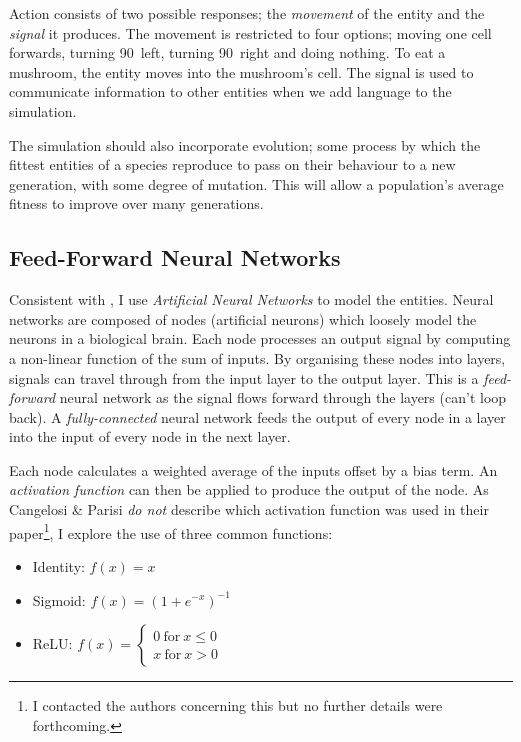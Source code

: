 \documentclass[12pt,a4paper]{report}
\begin{document}
Action consists of two possible responses; the \emph{movement} of the entity and the \emph{signal} it produces. The movement is restricted to four options; moving one cell forwards, turning 90\textdegree~left, turning 90\textdegree~right and doing nothing. To eat a mushroom, the entity moves into the mushroom's cell. The signal is used to communicate information to other entities when we add language to the simulation.

The simulation should also incorporate evolution; some process by which the fittest entities of a species reproduce to pass on their behaviour to a new generation, with some degree of mutation. This will allow a population's average fitness to improve over many generations.

\subsection{Feed-Forward Neural Networks}\label{section:neural}

Consistent with \citet{Cangelosi1998}, I use \emph{Artificial Neural Networks} to model the entities. Neural networks are composed of nodes (artificial neurons) which loosely model the neurons in a biological brain. Each node processes an output signal by computing a non-linear function of the sum of inputs. By organising these nodes into layers, signals can travel through from the input layer to the output layer. This is a \emph{feed-forward} neural network as the signal flows forward through the layers (can't loop back). A \emph{fully-connected} neural network feeds the output of every node in a layer into the input of every node in the next layer. 

Each node calculates a weighted average of the inputs offset by a bias term. An \emph{activation function} can then be applied to produce the output of the node. As Cangelosi \& Parisi \emph{do not} describe which activation function was used in their paper\footnote{I contacted the authors concerning this but no further details were forthcoming.}, I explore the use of three common functions:

\begin{itemize}
	\item Identity: $f(x) = x$
	\item Sigmoid: $f(x) = (1+e^{-x})^{-1}$
	\item ReLU: $ f(x) = 
    \left\{
        \begin{array}{ll}
          0~\mathrm{for}~x \leq 0 \\
          x~\mathrm{for}~x > 0
        \end{array}
      \right.
      $
\end{itemize}
\end{document}
